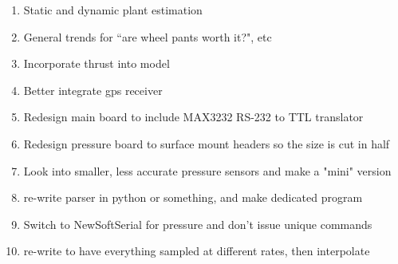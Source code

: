 \begin{enumerate}
\item Static and dynamic plant estimation
\item General trends for ``are wheel pants worth it?", etc
\item Incorporate thrust into model
\item Better integrate gps receiver
\item Redesign main board to include MAX3232 RS-232 to TTL translator
\item Redesign pressure board to surface mount headers so the size is cut in half
\item Look into smaller, less accurate pressure sensors and make a "mini" version
\item re-write parser in python or something, and make dedicated program
\item Switch to NewSoftSerial for pressure and don't issue unique commands
\item re-write to have everything sampled at different rates, then interpolate
\end{enumerate}